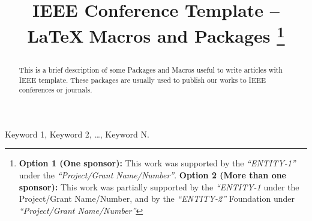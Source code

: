 \documentclass[conference]{IEEEtran}
\begin{document}
\title{IEEE Conference Template -- \LaTeX\,\,Macros and Packages 
\thanks{
\textbf{Option 1 (One sponsor):} This work was supported by the \textit{``ENTITY-1''} under the \textit{``Project/Grant Name/Number''}.
\textbf{Option 2 (More than one sponsor):} This work was partially supported by the \textit{``ENTITY-1} under the Project/Grant Name/Number, and by the \textit{``ENTITY-2''} Foundation under \textit{``Project/Grant Name/Number''}
} %

}


\author{
}


\maketitle

\begin{abstract}
This is a brief description of some Packages and Macros useful to write articles with IEEE template.
These packages are usually used to publish our works to IEEE conferences or journals.
\end{abstract}

\begin{IEEEkeywords}
Keyword 1, Keyword 2, \dots, Keyword N.
\end{IEEEkeywords}
\end{document}
